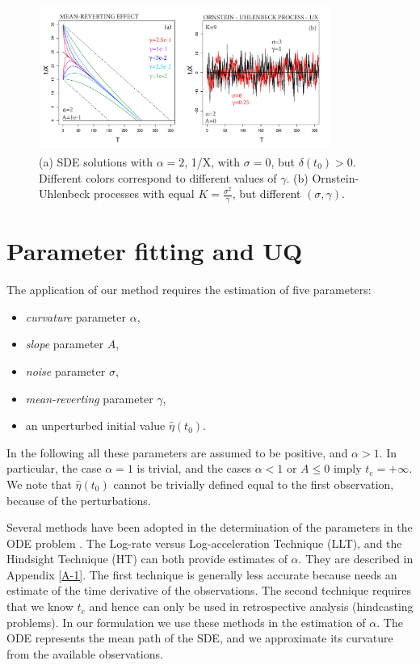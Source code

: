 \documentclass{article}
\begin{document}
\begin{figure}[H]
\centering
\includegraphics[width=0.85\textwidth]{Fig3_plus.png}
\caption{(a) SDE solutions with $\alpha=2$, 1/X, with $\sigma=0$, but $\delta(t_0)>0$. Different colors correspond to different values of $\gamma$. (b) Ornstein-Uhlenbeck processes with equal $K=\frac{\sigma^2}{\gamma}$, but different $(\sigma, \gamma)$.}
\label{Fig3}
\end{figure}

\newpage
\section{Parameter fitting and UQ}
The application of our method requires the estimation of five parameters:
\begin{itemize}
  \item {\it curvature} parameter $\alpha$,
  \item {\it slope} parameter $A$,
  \item {\it noise} parameter $\sigma$,
  \item {\it mean-reverting} parameter $\gamma$,
  \item an unperturbed initial value $\hat\eta(t_0)$.
\end{itemize}
In the following all these parameters are assumed to be positive, and $\alpha > 1$. In particular, the case $\alpha=1$ is trivial, and the cases $\alpha <1$ or $A\le0$ imply $t_e=+\infty$. We note that $\hat\eta(t_0)$ cannot be trivially defined equal to the first observation, because of the perturbations.

Several methods have been adopted in the determination of the parameters in the ODE problem \citep{Voight1988, Cornelius1995, Bell2011}. The Log-rate versus Log-acceleration Technique (LLT), and the Hindsight Technique (HT) can both provide estimates of $\alpha$. They are described in Appendix \ref{A-1}. The first technique is generally less accurate because needs an estimate of the time derivative of the observations. The second technique requires that we know $t_e$ and hence can only be used in retrospective analysis (hindcasting problems). In our formulation we use these methods in the estimation of $\alpha$. The ODE represents the mean path of the SDE, and we approximate its curvature from the available observations.
\end{document}
